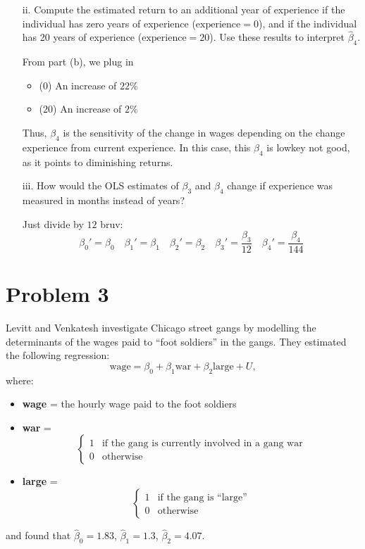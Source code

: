 \documentclass[11pt]{article}
\begin{document}
\begin{enumerate}
\begin{enumerate}
        \item[ii.] Compute the estimated return to an additional year of experience if the individual has zero years of experience ($\text{experience} = 0$), and if the individual has 20 years of experience ($\text{experience} = 20$). Use these results to interpret $\hat{\beta}_4$.
\begin{solution}
    From part (b), we plug in 
    \begin{itemize}
        \item ($0$) An increase of $22\%$
        \item ($20$) An increase of $2\%$
    \end{itemize}
    Thus, $\beta_4$ is the sensitivity of the change in wages depending on the change experience from current experience. In this case, this $\beta_4$ is lowkey not good, as it points to diminishing returns.  
\end{solution}
        \item[iii.] How would the OLS estimates of $\beta_3$ and $\beta_4$ change if experience was measured in months instead of years?
        \begin{solution}
            Just divide by $12$ bruv: 
            \[\beta_0' = \beta_0 \quad \beta_1'  = \beta_1 \quad \beta_2' = \beta_2 \quad \beta_3' = \frac{\beta_3}{12}\quad \beta_4' = \frac{\beta_4}{144}\]
        \end{solution}
    \end{enumerate}
\end{enumerate}

\newpage
\section*{Problem 3}

Levitt and Venkatesh investigate Chicago street gangs by modelling the determinants of the wages paid to “foot soldiers” in the gangs. They estimated the following regression:
\[
\text{wage} = \beta_0 + \beta_1 \text{war} + \beta_2 \text{large} + U,
\]
where:
\begin{itemize}
    \item \textbf{wage} = the hourly wage paid to the foot soldiers
    \item \textbf{war} = 
    \[
    \begin{cases}
    1 & \text{if the gang is currently involved in a gang war} \\
    0 & \text{otherwise}
    \end{cases}
    \]
    \item \textbf{large} = 
    \[
    \begin{cases}
    1 & \text{if the gang is ``large''} \\
    0 & \text{otherwise}
    \end{cases}
    \]
\end{itemize}
and found that $\hat{\beta}_0 = 1.83$, $\hat{\beta}_1 = 1.3$, $\hat{\beta}_2 = 4.07$.
\end{document}
